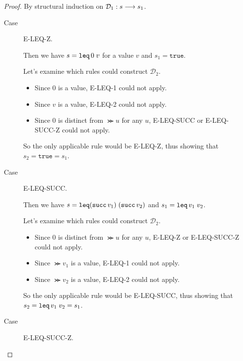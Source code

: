 \documentclass[11pt,letterpaper]{article}
\begin{document}
\begin{proof}
    By structural induction on $\mathcal{D}_1 : s \longrightarrow s_1$.

    \begin{description}
        \item[Case] E-LEQ-Z.

            Then we have $s = \operatorname{\mathtt{leq}} 0 \; v$
            for a value $v$
            and $s_1 = \mathtt{true}$.

            Let's examine which rules could construct $\mathcal{D}_2$.
            \begin{itemize}
                \item
                    Since $0$ is a value, E-LEQ-1 could not apply.
                \item
                    Since $v$ is a value, E-LEQ-2 could not apply.
                \item
                    Since $0$ is distinct from $\Succ u$ for any $u$,
                    E-LEQ-SUCC or E-LEQ-SUCC-Z could not apply.
            \end{itemize}

            So the only applicable rule would be E-LEQ-Z, thus showing that
            $s_2 = \mathtt{true} = s_1$.

        \item[Case] E-LEQ-SUCC.

            Then we have $s = \operatorname{\mathtt{leq}} (\operatorname{\mathtt{succ}} v_1) \; (\operatorname{\mathtt{succ}} v_2)$
            and $s_1 = \operatorname{\mathtt{leq}} v_1 \; v_2$.

            Let's examine which rules could construct $\mathcal{D}_2$.
            \begin{itemize}
                \item
                    Since $0$ is distinct from $\Succ u$ for any $u$,
                    E-LEQ-Z or E-LEQ-SUCC-Z could not apply.
                \item
                    Since $\Succ v_1$ is a value, E-LEQ-1 could not apply.
                \item
                    Since $\Succ v_2$ is a value, E-LEQ-2 could not apply.
            \end{itemize}

            So the only applicable rule would be E-LEQ-SUCC, thus showing that
            $s_2 = \operatorname{\mathtt{leq}} v_1 \; v_2 = s_1$.

        \item[Case] E-LEQ-SUCC-Z.


\end{description}
\end{proof}
\end{document}
